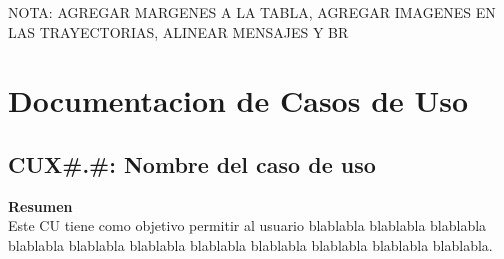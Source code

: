 \documentclass[10pt,letterpaper]{article}
\begin{document}
\begin{Large}
NOTA: AGREGAR MARGENES A LA TABLA, AGREGAR IMAGENES EN LAS TRAYECTORIAS, ALINEAR MENSAJES Y BR
\end{Large}

\section{Documentacion de Casos de Uso}
\subsection{CUX\#.\#: Nombre del caso de uso}
\textbf{\large Resumen}\\
Este CU tiene como objetivo permitir al usuario blablabla blablabla blablabla blablabla blablabla blablabla
 blablabla blablabla blablabla blablabla blablabla.\\
\end{document}

